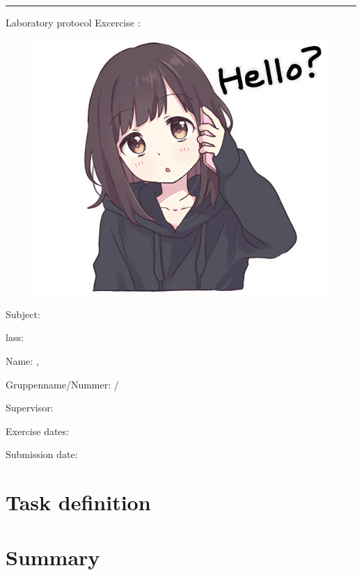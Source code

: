 \documentclass[a4paper]{article}
\begin{document}

\pagestyle{htl}
\section*{\topic}
\par\noindent\rule{\textwidth}{0.4pt}

Laboratory protocol
Excercise \exerciseNumber: \topic

\begin{figure}[h]
	\includegraphics[scale=0.4]{images/menheraPhoneHello.png}
	\centering
\end{figure}

\vspace*{\fill}
Subject:	\subject

Class:	\className

Name:	\studentone, \studentwo

Gruppenname/Nummer: \groupname /\groupnumber

Supervisor: 	\teacher \teachertwo

Exercise dates:	

Submission date:


\newpage
\tableofcontents
\newpage
{}

\section{Task definition}

\section{Summary}
\end{document}
